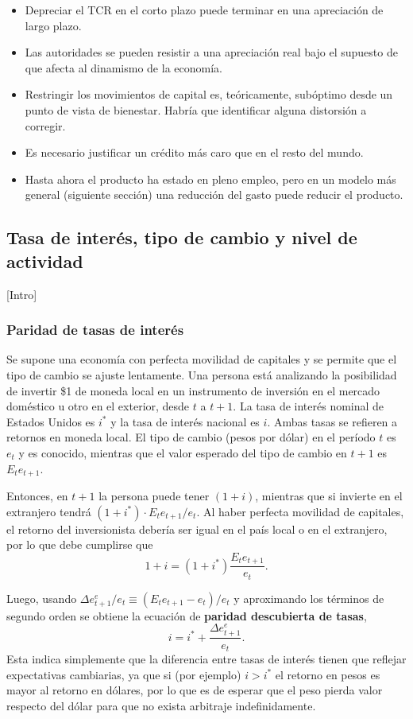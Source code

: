 \documentclass[DeGregorioResumen]{subfiles}
\begin{document}
\begin{itemize}
	\item Depreciar el TCR en el corto plazo puede terminar en una apreciación de largo plazo.
	\item Las autoridades se pueden resistir a una apreciación real bajo el supuesto de que afecta al dinamismo de la economía.
	\item Restringir los movimientos de capital es, teóricamente, subóptimo desde un punto de vista de bienestar. Habría que identificar alguna distorsión a corregir.
	\item Es necesario justificar un crédito más caro que en el resto del mundo.
	\item Hasta ahora el producto ha estado en pleno empleo, pero en un modelo más general (siguiente sección) una reducción del gasto puede reducir el producto.
\end{itemize}

\subsection{Tasa de interés, tipo de cambio y nivel de actividad}

[Intro]

\subsubsection{Paridad de tasas de interés}

Se supone una economía con perfecta movilidad de capitales y se permite que el tipo de cambio se ajuste lentamente. Una persona está analizando la posibilidad de invertir \$1 de moneda local en un instrumento de inversión en el mercado doméstico u otro en el exterior, desde $t$ a $t + 1$. La tasa de interés nominal de Estados Unidos es $i^*$ y la tasa de interés nacional es $i$. Ambas tasas se refieren a retornos en moneda local. El tipo de cambio (pesos por dólar) en el período $t$ es $e_t$ y es conocido, mientras que el valor esperado del tipo de cambio en $t+1$ es $E_t e_{t+1}$.

Entonces, en $t+1$ la persona puede tener $(1+i)$, mientras que si invierte en el extranjero tendrá $(1+i^*)\cdot E_t e_{t+1}/e_t$. Al haber perfecta movilidad de capitales, el retorno del inversionista debería ser igual en el país local o en el extranjero, por lo que debe cumplirse que
\[
1+i = (1+i^*)\frac{E_t e_{t+1}}{e_t}.
\]

Luego, usando $\Delta e^e_{t+1}/e_t \equiv (E_t e_{t+1}-e_t)/e_t $ y aproximando los términos de segundo orden se obtiene la ecuación de \textbf{paridad descubierta de tasas},
\begin{equation}
	i = i^* + \frac{\Delta e^e_{t+1}}{e_t}.
	\label{eq:paridad_descubierta}
\end{equation}
Esta indica simplemente que la diferencia entre tasas de interés tienen que reflejar expectativas cambiarias, ya que si (por ejemplo) $i>i^*$ el retorno en pesos es mayor al retorno en dólares, por lo que es de esperar que el peso pierda valor respecto del dólar para que no exista arbitraje indefinidamente.
\end{document}
